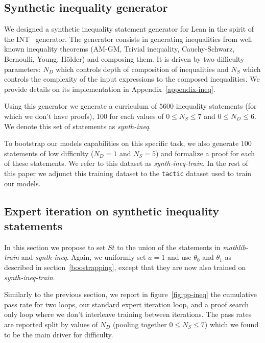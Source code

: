\documentclass[nohyperref]{article}
\theoremstyle{plain}
\theoremstyle{definition}
\theoremstyle{remark}
\begin{document}
\subsection{Synthetic inequality generator}

We designed a synthetic inequality statement generator for Lean in the spirit of the INT~\cite{wu2020int} generator. The generator consists in generating inequalities from well known inequality theorems (AM-GM, Trivial inequality, Cauchy-Schwarz, Bernoulli, Young, Hölder) and composing them. It is driven by two difficulty parameters: $N_D$ which controls depth of composition of inequalities and $N_S$ which controls the complexity of the input expressions to the composed inequalities. We provide details on its implementation in Appendix~\ref{appendix-ineq}.

Using this generator we generate a curriculum of $5600$ inequality statements (for which we don't have proofs), $100$ for each values of $0 \leq N_S \leq 7$ and $0 \leq N_D \leq 6$. We denote this set of statements as \textit{synth-ineq}.

To bootstrap our models capabilities on this specific task, we also generate $100$ statements of low difficulty ($N_D=1$ and $N_S=5$) and formalize a proof for each of these statements. We refer to this dataset as \textit{synth-ineq-train}. In the rest of this paper we adjunct this training dataset to the \texttt{tactic} dataset used to train our models.

\subsection{Expert iteration on synthetic inequality statements}

In this section we propose to set $\mathit{St}$ to the union of the statements in \textit{mathlib-train} and \textit{synth-ineq}. Again, we uniformly set $a=1$ and use $\theta_0$ and $\theta_1$ as described in section~\ref{boostrapping}, except that they are now also trained on \textit{synth-ineq-train}.

Similarly to the previous section, we report in figure~\ref{fig:pp-ineq} the cumulative pass rate for two loops, our standard expert iteration loop, and a proof search only loop where we don't interleave training between iterations. The pass rates are reported split by values of $N_D$ (pooling together $0 \leq N_S \leq 7$) which we found to be the main driver for difficulty.
\end{document}
